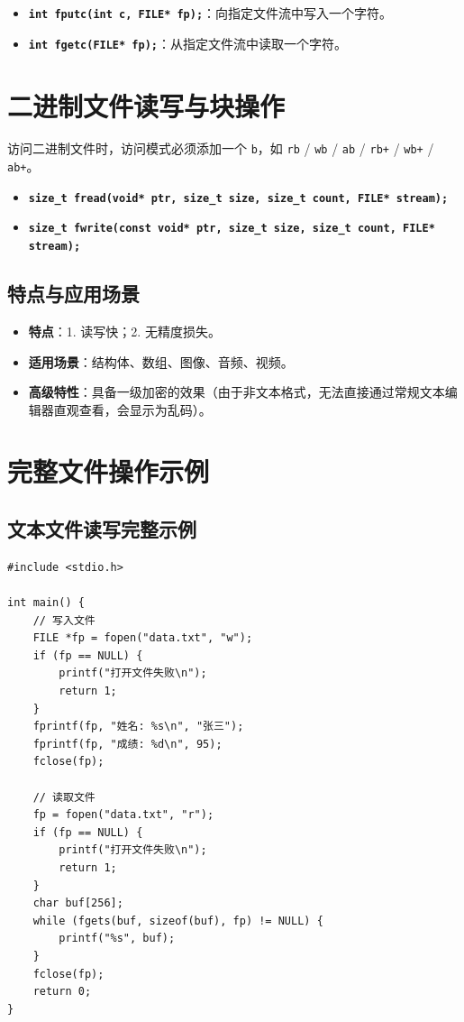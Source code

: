 \begin{itemize}
    \item \textbf{\texttt{int fputc(int c, FILE* fp);}}：向指定文件流中写入一个字符。
    \item \textbf{\texttt{int fgetc(FILE* fp);}}：从指定文件流中读取一个字符。
\end{itemize}

\section{二进制文件读写与块操作}

访问二进制文件时，访问模式必须添加一个 \texttt{b}，如 \texttt{rb} / \texttt{wb} / \texttt{ab} / \texttt{rb+} / \texttt{wb+} / \texttt{ab+}。

\begin{itemize}
    \item \textbf{\texttt{size\_t fread(void* ptr, size\_t size, size\_t count, FILE* stream);}}
    \item \textbf{\texttt{size\_t fwrite(const void* ptr, size\_t size, size\_t count, FILE* stream);}}
\end{itemize}

\subsection{特点与应用场景}

\begin{itemize}
    \item \textbf{特点}：1. 读写快；2. 无精度损失。
    \item \textbf{适用场景}：结构体、数组、图像、音频、视频。
    \item \textbf{高级特性}：具备一级加密的效果（由于非文本格式，无法直接通过常规文本编辑器直观查看，会显示为乱码）。
\end{itemize}

\section{完整文件操作示例}

\subsection{文本文件读写完整示例}

\begin{lstlisting}[caption={文本文件写入与读取}]
#include <stdio.h>

int main() {
    // 写入文件
    FILE *fp = fopen("data.txt", "w");
    if (fp == NULL) {
        printf("打开文件失败\n");
        return 1;
    }
    fprintf(fp, "姓名: %s\n", "张三");
    fprintf(fp, "成绩: %d\n", 95);
    fclose(fp);
    
    // 读取文件
    fp = fopen("data.txt", "r");
    if (fp == NULL) {
        printf("打开文件失败\n");
        return 1;
    }
    char buf[256];
    while (fgets(buf, sizeof(buf), fp) != NULL) {
        printf("%s", buf);
    }
    fclose(fp);
    return 0;
}
\end{lstlisting}

